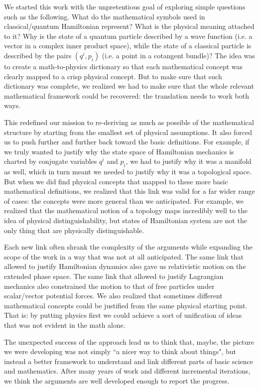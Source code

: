 \documentclass[aps,pra,10pt,twocolumn,floatfix,nofootinbib]{revtex4-1}
\numberwithin{equation}{section}
\theoremstyle{definition}
\begin{document}
We started this work with the unpretentious goal of exploring simple questions such as the following. What do the mathematical symbols used in classical/quantum Hamiltonian represent? What is the physical meaning attached to it? Why is the state of a quantum particle described by a wave function (i.e. a vector in a complex inner product space), while the state of a classical particle is described by the pairs $(q^i, p_i)$ (i.e. a point in a cotangent bundle)? The idea was to create a math-to-physics dictionary so that each mathematical concept was clearly mapped to a crisp physical concept. But to make sure that such dictionary was complete, we realized we had to make sure that the whole relevant mathematical framework could be recovered: the translation needs to work both ways.

This redefined our mission to re-deriving as much as possible of the mathematical structure by starting from the smallest set of physical assumptions. It also forced us to push further and further back toward the basic definitions. For example, if we truly wanted to justify why the state space of Hamiltonian mechanics is charted by conjugate variables $q^i$ and $p_i$, we had to justify why it was a manifold as well, which in turn meant we needed to justify why it was a topological space. But when we did find physical concepts that mapped to these more basic mathematical definitions, we realized that this link was valid for a far wider range of cases: the concepts were more general than we anticipated. For example, we realized that the mathematical notion of a topology maps incredibly well to the idea of physical distinguishability, but states of Hamiltonian system are not the only thing that are physically distinguishable.

Each new link often shrank the complexity of the arguments while expanding the scope of the work in a way that was not at all anticipated. The same link that allowed to justify Hamiltonian dynamics also gave us relativistic motion on the extended phase space. The same link that allowed to justify Lagrangian mechanics also constrained the motion to that of free particles under scalar/vector potential forces. We also realized that sometimes different mathematical concepts could be justified from the same physical starting point. That is: by putting physics first we could achieve a sort of unification of ideas that was not evident in the math alone.

The unexpected success of the approach lead us to think that, maybe, the picture we were developing was not simply ``a nicer way to think about things", but instead a better framework to understand and link different parts of basic science and mathematics. After many years of work and different incremental iterations, we think the arguments are well developed enough to report the progress.
\end{document}
